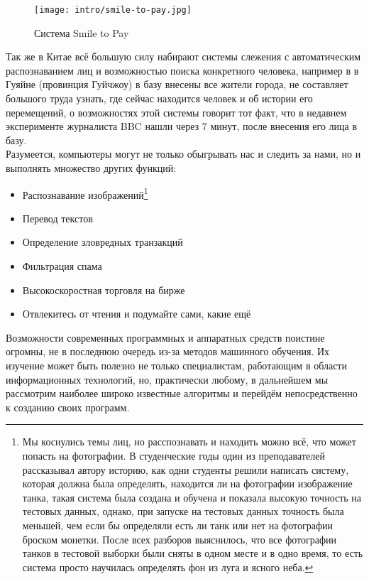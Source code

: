 \begin{figure}[H]
    \centering
    \texttt{[image: intro/smile-to-pay.jpg]}
    \caption{Система Smile to Pay} %
\end{figure}

Так же в Китае всё большую силу набирают системы слежения с автоматическим распознаванием лиц и возможностью поиска конкретного человека, например в в Гуяйне (провинция Гуйчжоу) в базу внесены все жители города, не составляет большого труда узнать, где сейчас находится человек и об истории его перемещений, о возможностях этой системы говорит тот факт, что в недавнем эксперименте журналиста BBC нашли через 7 минут, после внесения его лица в базу\cite{china-face-recognition}.\\

Разумеется, компьютеры могут не только обыгрывать нас и следить за нами, но и выполнять множество других функций:\\
\begin{itemize}
    \item Распознавание изображений\footnote{Мы коснулись темы лиц, но расспознавать и находить можно всё, что может попасть на фотографии. В студенческие годы один из преподавателей рассказывал автору историю, как одни студенты решили написать систему, которая должна была определять, находится ли на фотографии изображение танка, такая система была создана и обучена и показала высокую точность на тестовых данных, однако, при запуске на тестовых данных точность была меньшей, чем если бы определяли есть ли танк или нет на фотографии броском монетки. После всех разборов выяснилось, что все фотографии танков в тестовой выборки были сняты в одном месте и в одно время, то есть система просто научилась определять фон из луга и ясного неба.}
    \item Перевод текстов
    \item Определение зловредных транзакций
    \item Фильтрация спама
    \item Высокоскоростная торговля на бирже
    \item Отвлекитесь от чтения и подумайте сами, какие ещё
\end{itemize}

Возможности современных программных и аппаратных средств поистине огромны, не в последнюю очередь из-за методов машинного обучения. Их изучение может быть полезно не только специалистам, работающим в области информационных технологий, но, практически любому, в дальнейшем мы рассмотрим наиболее широко известные алгоритмы и перейдём непосредственно к созданию своих программ.







